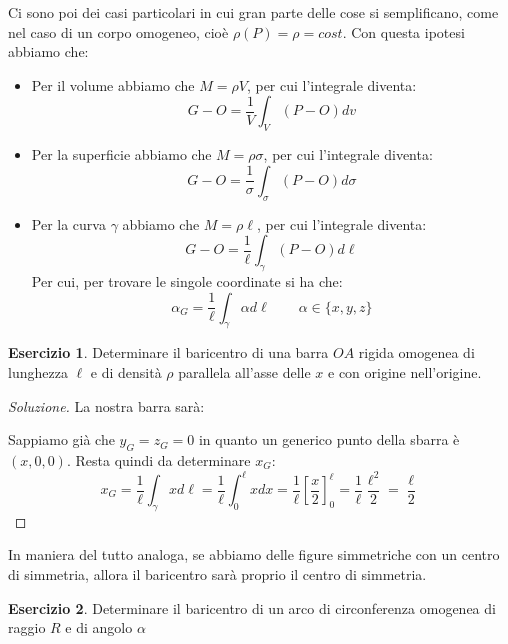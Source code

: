 \documentclass[11pt,a4paper,twoside]{article}
\theoremstyle{definition}
\newtheorem{ese}{Esercizio}[section]
\newenvironment{sol}
	{\renewcommand\qedsymbol{$\blacksquare$}\begin{proof}[Soluzione]}
	{\end{proof}}
\begin{document}
Ci sono poi dei casi particolari in cui gran parte delle cose si semplificano, come nel caso di un corpo omogeneo, cioè $\rho (P) = \rho = cost$. Con questa ipotesi abbiamo che:
\begin{itemize}
	\item Per il volume abbiamo che $M = \rho V$, per cui l'integrale diventa:
		\[ G-O = \frac 1V \int_V(P-O)dv \]
	\item Per la superficie abbiamo che $M = \rho \sigma$, per cui l'integrale diventa:
		\[ G-O = \frac 1 \sigma \int_\sigma (P-O)d\sigma \]
	\item Per la curva $\gamma$ abbiamo che $M = \rho \ell$, per cui l'integrale diventa:
		\[ G-O = \frac 1 \ell \int_\gamma (P-O)d\ell \]
		Per cui, per trovare le singole coordinate si ha che:
		\[ \alpha_G = \frac 1 \ell \int_\gamma \alpha d\ell \qquad \alpha \in \{x,y,z\} \]
\end{itemize}

\begin{ese}
	Determinare il baricentro di una barra $OA$ rigida omogenea di lunghezza $\ell$ e di densità $\rho$ parallela all'asse delle $x$ e con origine nell'origine.
\end{ese}

\begin{sol}
	La nostra barra sarà:
	\begin{center}
	\end{center}
	Sappiamo già che $y_G = z_G = 0$ in quanto un generico punto della sbarra è $(x,0,0)$. Resta quindi da determinare $x_G$:
	\[ x_G = \frac 1 \ell \int_\gamma x d\ell = \frac 1\ell \int_0^\ell x dx = \frac 1\ell \left[ \frac x2 \right]_0^\ell = \frac 1 \ell \frac{\ell^2}{2} = \frac \ell 2 \]
\end{sol}

In maniera del tutto analoga, se abbiamo delle figure simmetriche con un centro di simmetria, allora il baricentro sarà proprio il centro di simmetria.

\begin{ese}
	Determinare il baricentro di un arco di circonferenza omogenea di raggio $R$ e di angolo $\alpha$
\end{ese}
\end{document}
